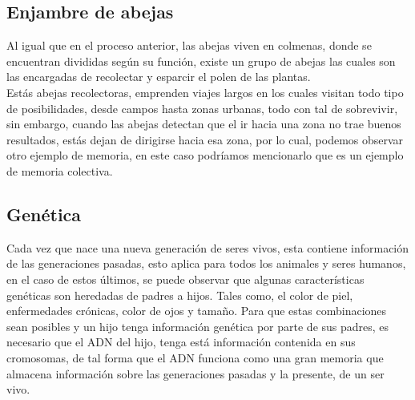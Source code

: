 \subsection{Enjambre de abejas}
	Al igual que en el proceso anterior, las abejas viven en colmenas, donde se encuentran divididas según su función, existe un grupo de abejas las cuales son las encargadas de recolectar y esparcir el polen de las plantas.\\ Estás abejas recolectoras, emprenden viajes largos en los cuales visitan todo tipo de posibilidades, desde campos hasta zonas urbanas, todo con tal de sobrevivir, sin embargo, cuando las abejas detectan que el ir hacia una zona no trae buenos resultados, estás dejan de dirigirse hacia esa zona, por lo cual, podemos observar otro ejemplo de memoria, en este caso podríamos mencionarlo que es un ejemplo de memoria colectiva.

\subsection{Genética}
	Cada vez que nace una nueva generación de seres vivos, esta contiene información de las generaciones pasadas, esto aplica para todos los animales y seres humanos, en el caso de estos últimos, se puede observar que algunas características genéticas son heredadas de padres a hijos. Tales como, el color de piel, enfermedades crónicas, color de ojos y tamaño. Para que estas combinaciones sean posibles y un hijo tenga información genética por parte de sus padres, es necesario que el ADN del hijo, tenga está información contenida en sus cromosomas, de tal forma que el ADN funciona como una gran memoria que almacena información sobre las generaciones pasadas y la presente, de un ser vivo.

